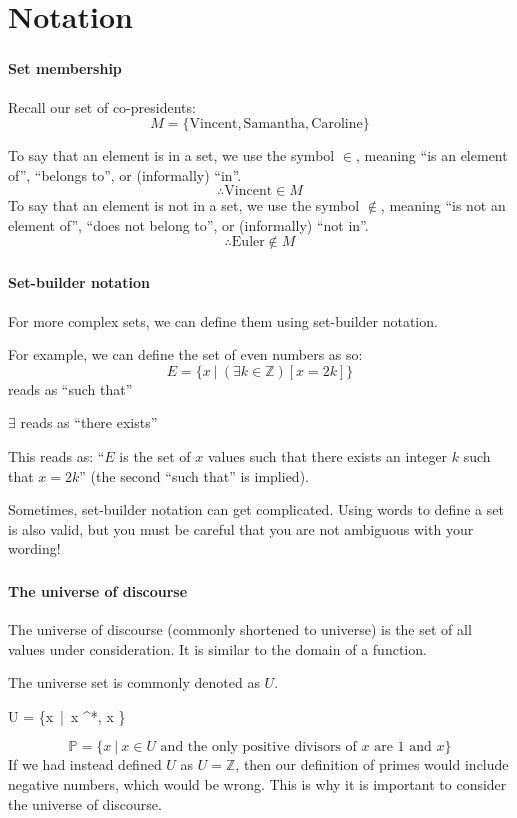 	\section{Notation}
	\begin{frame}
		\frametitle{\secname}
		\framesubtitle{Set membership}
		Recall our set of co-presidents:
		\[M = \{\text{Vincent}, \text{Samantha}, \text{Caroline}\}\]
		
		To say that an element is in a set, we use the symbol $\in$, meaning ``is an element of'', ``belongs to'', or (informally) ``in''.
		\[\therefore \text{Vincent} \in M\]
		To say that an element is not in a set, we use the symbol $\notin$, meaning ``is not an element of'', ``does not belong to'', or (informally) ``not in''.
		\[\therefore \text{Euler} \notin M\]
	\end{frame}
	\begin{frame}
		\frametitle{\secname}
		\framesubtitle{Set-builder notation}
		For more complex sets, we can define them using set-builder notation.

		For example, we can define the set of even numbers as so:
		\[E = \{x\ |\ (\exists k \in \mathbb{Z})[x = 2k]\}\]
		\textbar{} reads as ``such that''

		$\exists$ reads as ``there exists''

		This reads as: ``$E$ is the set of $x$ values such that there exists an integer $k$ such that $x = 2k$'' (the second ``such that'' is implied).

		\scriptsize
		Sometimes, set-builder notation can get complicated. Using words to define a set is also valid, but you must be careful that you are \alert{not} ambiguous with your wording!
	\end{frame}
	\begin{frame}
		\frametitle{\secname}
		\framesubtitle{The universe of discourse}
		The universe of discourse (commonly shortened to universe) is the set of all values under consideration. It is similar to the domain of a function.

		The universe set is commonly denoted as $U$.
		\begin{example}
			\begin{compactmath}
				U = \{x\ |\ x \in {}^*, x \neq 1\}
			\end{compactmath}
			\[\mathbb{P} = \{x\ |\ x \in U \text{ and the only positive divisors of $x$ are $1$ and $x$}\}\]
			If we had instead defined $U$ as $U = \mathbb{Z}$, then our definition of primes would include negative numbers, which would be wrong. This is why it is important to consider the universe of discourse.
		\end{example}
	\end{frame}
